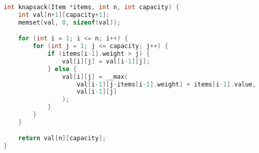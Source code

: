 
\begin{lstlisting}[language=C]
int knapsack(Item *items, int n, int capacity) {
	int val[n+1][capacity+1];
	memset(val, 0, sizeof(val));

	for (int i = 1; i <= n; i++) {
		for (int j = 1; j <= capacity; j++) {
			if (items[i-1].weight > j) {
				val[i][j] = val[i-1][j];
			} else {
				val[i][j] = __max(
					val[i-1][j-items[i-1].weight] + items[i-1].value,
					val[i-1][j]
				);
			}
		}
	}

	return val[n][capacity];
}
\end{lstlisting}

\newpage